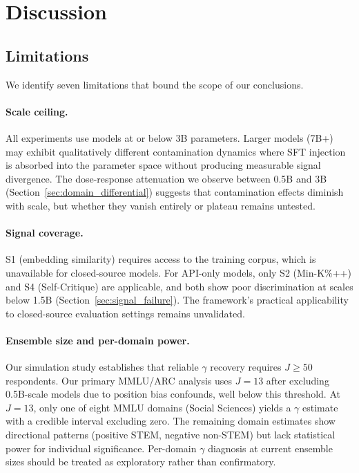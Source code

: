 \section{Discussion}
\label{sec:discussion}

\subsection{Limitations}
\label{sec:limitations}

We identify seven limitations that bound the scope of our conclusions.

\paragraph{Scale ceiling.}
All experiments use models at or below 3B parameters. Larger models (7B+) may exhibit qualitatively different contamination dynamics where SFT injection is absorbed into the parameter space without producing measurable signal divergence. The dose-response attenuation we observe between 0.5B and 3B (Section~\ref{sec:domain_differential}) suggests that contamination effects diminish with scale, but whether they vanish entirely or plateau remains untested.

\paragraph{Signal coverage.}
S1 (embedding similarity) requires access to the training corpus, which is unavailable for closed-source models. For API-only models, only S2 (Min-K\%++) and S4 (Self-Critique) are applicable, and both show poor discrimination at scales below 1.5B (Section~\ref{sec:signal_failure}). The framework's practical applicability to closed-source evaluation settings remains unvalidated.

\paragraph{Ensemble size and per-domain power.}
Our simulation study establishes that reliable $\gamma$ recovery requires $J \geq 50$ respondents. Our primary MMLU/ARC analysis uses $J = 13$ after excluding 0.5B-scale models due to position bias confounds, well below this threshold. At $J = 13$, only one of eight MMLU domains (Social Sciences) yields a $\gamma$ estimate with a credible interval excluding zero. The remaining domain estimates show directional patterns (positive STEM, negative non-STEM) but lack statistical power for individual significance. Per-domain $\gamma$ diagnosis at current ensemble sizes should be treated as exploratory rather than confirmatory.

